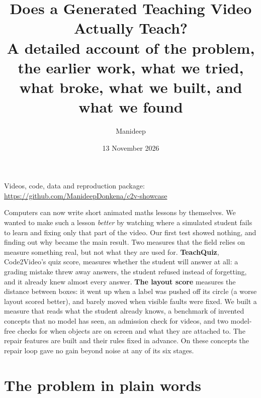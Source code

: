 \documentclass[11pt]{article}
\title{Does a Generated Teaching Video Actually Teach?\\[4pt]
\large A detailed account of the problem, the earlier work, what we tried, what broke, what we built, and what we
found}
\author{Manideep}
\date{13 November 2026}
\begin{document}
\sloppy%
\maketitle
\begin{center}\small Videos, code, data and reproduction package: \url{https://github.com/ManideepDonkena/c2v-showcase}\end{center}

\begin{inshort}
Computers can now write short animated maths lessons by themselves. We wanted to make such a lesson \emph{better} by
watching where a simulated student fails to learn and fixing only that part of the video. Our first test showed
nothing, and finding out why became the main result. Two measures that the field relies on measure something real,
but not what they are used for. \textbf{TeachQuiz}, Code2Video's quiz score, measures whether the student will answer at all: a grading
mistake threw away answers, the student refused instead of forgetting, and it already knew almost every answer.
\textbf{The layout score} measures the distance between boxes: it went up when a label was pushed off its circle (a worse
layout scored better), and barely moved when \ClaudeFaults{} visible faults were fixed. We built a measure that reads what the student already knows, a
benchmark of invented concepts that no model has seen, an admission check for videos, and two model-free checks for when
objects are on screen and what they are attached to. The repair features are built and their rules fixed in advance.
On these concepts the repair loop gave no gain beyond noise at any of its six stages.
\end{inshort}



\tableofcontents
\newpage

\section{The problem in plain words}
\end{document}

